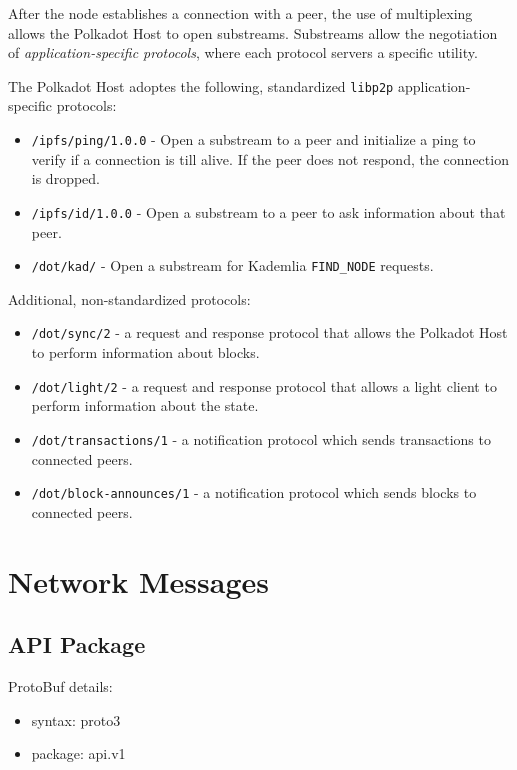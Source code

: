 After the node establishes a connection with a peer, the use of multiplexing
allows the Polkadot Host to open substreams. Substreams allow the negotiation of
\textit{application-specific protocols}, where each protocol servers a specific
utility.

The Polkadot Host adoptes the following, standardized \verb|libp2p|
application-specific protocols:

\begin{itemize}
    \item \verb|/ipfs/ping/1.0.0| - Open a substream to a peer and initialize a
    ping to verify if a connection is till alive. If the peer does not respond,
    the connection is dropped.
    \item \verb|/ipfs/id/1.0.0| - Open a substream to a peer to ask information
    about that peer.
    \item \verb|/dot/kad/| - Open a substream for Kademlia
    \verb|FIND_NODE| requests.
\end{itemize}

Additional, non-standardized protocols:

\begin{itemize}
    \item \verb|/dot/sync/2| - a request and response protocol that
    allows the Polkadot Host to perform information about blocks.
    \item \verb|/dot/light/2| - a request and response protocol that
    allows a light client to perform information about the state.
    \item \verb|/dot/transactions/1| - a notification protocol which
    sends transactions to connected peers.
    \item \verb|/dot/block-announces/1| - a notification protocol
    which sends blocks to connected peers.
\end{itemize}

\section{Network Messages}

\subsection{API Package}

ProtoBuf details:

\begin{itemize}
    \item syntax: proto3
    \item package: api.v1
\end{itemize}

